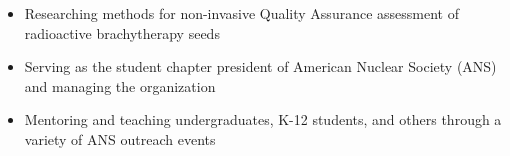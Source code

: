 \begin{minipage}{\textwidth}
	\begin{center}
	\begin{itemize}
		\item Researching methods for non-invasive Quality Assurance assessment of radioactive brachytherapy seeds
		\item Serving as the student chapter president of American Nuclear Society (ANS) and managing the organization
		\item Mentoring and teaching undergraduates, K-12 students, and others through a variety of ANS outreach events %
	\end{itemize}
	\end{center}
\end{minipage}



